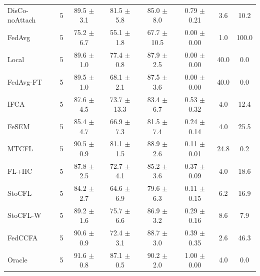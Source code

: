 {{\begin{tabular}{l r c c c c c c}
DisCo-noAttach & 5 & 89.5 $\pm$ 3.1 & 81.5 $\pm$ 5.8 & 85.0 $\pm$ 8.0 & 0.79 $\pm$ 0.21 & 3.6 & 10.2 \\
FedAvg & 5 & 75.2 $\pm$ 6.7 & 55.1 $\pm$ 1.8 & 67.7 $\pm$ 10.5 & 0.00 $\pm$ 0.00 & 1.0 & 100.0 \\
Local & 5 & 89.6 $\pm$ 1.0 & 77.4 $\pm$ 0.8 & 87.9 $\pm$ 2.5 & 0.00 $\pm$ 0.00 & 40.0 & 0.0 \\
FedAvg-FT & 5 & 89.5 $\pm$ 1.0 & 68.1 $\pm$ 2.1 & 87.5 $\pm$ 3.6 & 0.00 $\pm$ 0.00 & 40.0 & 0.0 \\
IFCA & 5 & 87.6 $\pm$ 4.5 & 73.7 $\pm$ 13.3 & 83.4 $\pm$ 6.7 & 0.53 $\pm$ 0.32 & 4.0 & 12.4 \\
FeSEM & 5 & 85.4 $\pm$ 4.7 & 66.9 $\pm$ 7.3 & 81.5 $\pm$ 7.4 & 0.24 $\pm$ 0.14 & 4.0 & 25.5 \\
MTCFL & 5 & 90.5 $\pm$ 0.9 & 81.1 $\pm$ 1.5 & 88.9 $\pm$ 2.6 & 0.11 $\pm$ 0.01 & 24.8 & 0.2 \\
FL+HC & 5 & 87.8 $\pm$ 2.5 & 72.7 $\pm$ 4.1 & 85.2 $\pm$ 3.6 & 0.37 $\pm$ 0.09 & 4.0 & 18.6 \\
StoCFL & 5 & 84.2 $\pm$ 2.7 & 64.6 $\pm$ 6.9 & 79.6 $\pm$ 6.3 & 0.11 $\pm$ 0.15 & 6.2 & 16.9 \\
StoCFL-W & 5 & 89.2 $\pm$ 1.6 & 75.7 $\pm$ 6.6 & 86.9 $\pm$ 3.2 & 0.29 $\pm$ 0.16 & 8.6 & 7.9 \\
FedCCFA & 5 & 90.6 $\pm$ 0.9 & 72.4 $\pm$ 3.1 & 88.7 $\pm$ 3.0 & 0.39 $\pm$ 0.35 & 2.6 & 46.3 \\
Oracle & 5 & 91.6 $\pm$ 0.8 & 87.1 $\pm$ 0.5 & 90.2 $\pm$ 2.0 & 1.00 $\pm$ 0.00 & 4.0 & 0.0 \\
\bottomrule
\end{tabular}}
}
